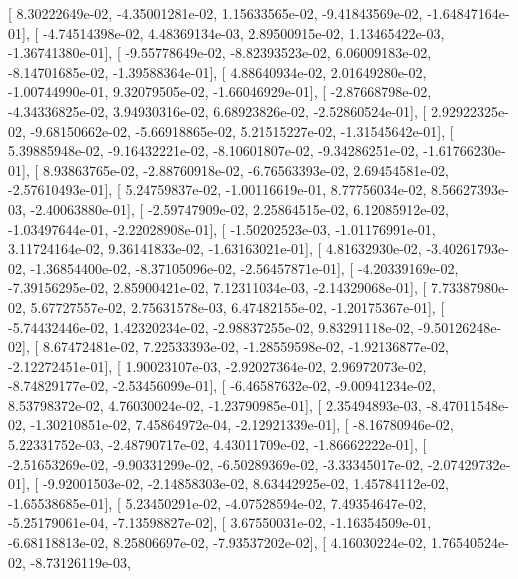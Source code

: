 \documentclass{article}
\begin{document}
       [  8.30222649e-02,  -4.35001281e-02,   1.15633565e-02,
         -9.41843569e-02,  -1.64847164e-01],
       [ -4.74514398e-02,   4.48369134e-03,   2.89500915e-02,
          1.13465422e-03,  -1.36741380e-01],
       [ -9.55778649e-02,  -8.82393523e-02,   6.06009183e-02,
         -8.14701685e-02,  -1.39588364e-01],
       [  4.88640934e-02,   2.01649280e-02,  -1.00744990e-01,
          9.32079505e-02,  -1.66046929e-01],
       [ -2.87668798e-02,  -4.34336825e-02,   3.94930316e-02,
          6.68923826e-02,  -2.52860524e-01],
       [  2.92922325e-02,  -9.68150662e-02,  -5.66918865e-02,
          5.21515227e-02,  -1.31545642e-01],
       [  5.39885948e-02,  -9.16432221e-02,  -8.10601807e-02,
         -9.34286251e-02,  -1.61766230e-01],
       [  8.93863765e-02,  -2.88760918e-02,  -6.76563393e-02,
          2.69454581e-02,  -2.57610493e-01],
       [  5.24759837e-02,  -1.00116619e-01,   8.77756034e-02,
          8.56627393e-03,  -2.40063880e-01],
       [ -2.59747909e-02,   2.25864515e-02,   6.12085912e-02,
         -1.03497644e-01,  -2.22028908e-01],
       [ -1.50202523e-03,  -1.01176991e-01,   3.11724164e-02,
          9.36141833e-02,  -1.63163021e-01],
       [  4.81632930e-02,  -3.40261793e-02,  -1.36854400e-02,
         -8.37105096e-02,  -2.56457871e-01],
       [ -4.20339169e-02,  -7.39156295e-02,   2.85900421e-02,
          7.12311034e-03,  -2.14329068e-01],
       [  7.73387980e-02,   5.67727557e-02,   2.75631578e-03,
          6.47482155e-02,  -1.20175367e-01],
       [ -5.74432446e-02,   1.42320234e-02,  -2.98837255e-02,
          9.83291118e-02,  -9.50126248e-02],
       [  8.67472481e-02,   7.22533393e-02,  -1.28559598e-02,
         -1.92136877e-02,  -2.12272451e-01],
       [  1.90023107e-03,  -2.92027364e-02,   2.96972073e-02,
         -8.74829177e-02,  -2.53456099e-01],
       [ -6.46587632e-02,  -9.00941234e-02,   8.53798372e-02,
          4.76030024e-02,  -1.23790985e-01],
       [  2.35494893e-03,  -8.47011548e-02,  -1.30210851e-02,
          7.45864972e-04,  -2.12921339e-01],
       [ -8.16780946e-02,   5.22331752e-03,  -2.48790717e-02,
          4.43011709e-02,  -1.86662222e-01],
       [ -2.51653269e-02,  -9.90331299e-02,  -6.50289369e-02,
         -3.33345017e-02,  -2.07429732e-01],
       [ -9.92001503e-02,  -2.14858303e-02,   8.63442925e-02,
          1.45784112e-02,  -1.65538685e-01],
       [  5.23450291e-02,  -4.07528594e-02,   7.49354647e-02,
         -5.25179061e-04,  -7.13598827e-02],
       [  3.67550031e-02,  -1.16354509e-01,  -6.68118813e-02,
          8.25806697e-02,  -7.93537202e-02],
       [  4.16030224e-02,   1.76540524e-02,  -8.73126119e-03,
\end{document}
